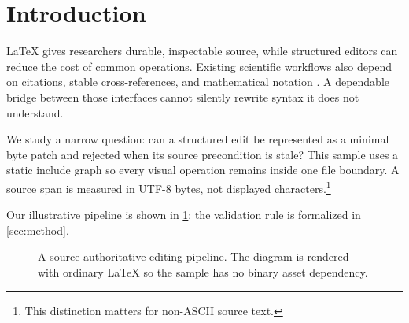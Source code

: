 \section{Introduction}
\label{sec:introduction}

LaTeX gives researchers durable, inspectable source, while structured editors
can reduce the cost of common operations. Existing scientific workflows also
depend on citations, stable cross-references, and mathematical notation
\cite{lamport1994latex,vaswani2017attention}. A dependable bridge between those
interfaces cannot silently rewrite syntax it does not understand.

We study a narrow question: can a structured edit be represented as a minimal
byte patch and rejected when its source precondition is stale? This sample uses
a static include graph so every visual operation remains inside one file
boundary. A source span is measured in UTF-8 bytes, not displayed characters.\footnote{This distinction matters for non-ASCII source text.}

Our illustrative pipeline is shown in \cref{fig:pipeline}; the validation rule
is formalized in \cref{sec:method}.

\begin{figure}[t]
  \centering
  \caption{A source-authoritative editing pipeline. The diagram is rendered
  with ordinary LaTeX so the sample has no binary asset dependency.}
  \label{fig:pipeline}
\end{figure}
